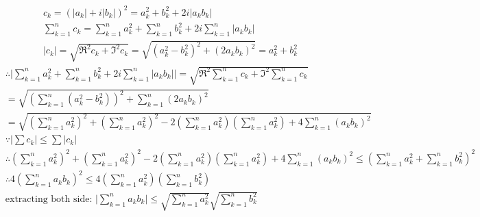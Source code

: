 	\begin{align*}
		&c_k = (|a_k| + i |b_k|)^2 = a_k^2 + b_k^2 + 2i |a_k b_k|\\
		&\sum_{k=1}^n c_k = \sum_{k=1}^n a_k^2 + \sum_{k=1}^n b_k^2 + 2i \sum_{k=1}^n |a_k b_k|\\
		&|c_k| = \sqrt{\Re^2 c_k + \Im^2 c_k} = \sqrt{(a_k^2-b_k^2)^2 + (2a_kb_k)^2} = a_k^2+b_k^2
	\end{align*}
	\begin{align*}
		&\therefore \Big| \sum_{k=1}^n a_k^2 + \sum_{k=1}^n b_k^2 + 2i \sum_{k=1}^n |a_k b_k| \Big|
		= \sqrt{\Re^2 \sum_{k=1}^n c_k + \Im^2 \sum_{k=1}^n c_k}\\
		&= \sqrt{(\sum_{k=1}^n (a_k^2-b_k^2))^2 + \sum_{k=1}^n (2a_kb_k)^2}\\
		&= \sqrt{(\sum_{k=1}^n a_k^2)^2 + (\sum_{k=1}^n a_k^2)^2 - 2(\sum_{k=1}^n a_k^2)(\sum_{k=1}^n a_k^2) + 4\sum_{k=1}^n (a_kb_k)^2}\\	
 		&\because |\sum c_k| \leqslant \sum|c_k| \\
 		&\therefore  (\sum_{k=1}^n a_k^2)^2 + (\sum_{k=1}^n a_k^2)^2 - 2(\sum_{k=1}^n a_k^2)(\sum_{k=1}^n a_k^2) + 4\sum_{k=1}^n (a_kb_k)^2 \leqslant (\sum_{k=1}^n a_k^2 + \sum_{k=1}^n b_k^2)^2\\
 		&\therefore 4(\sum_{k=1}^n a_k b_k)^2 \leqslant 4(\sum_{k=1}^n a_k^2) (\sum_{k=1}^n b_k^2)\\
 		& \text{extracting both side: } \Big|\sum_{k=1}^n a_k b_k\Big| \leqslant \sqrt{\sum_{k=1}^n a_k^2} \sqrt{\sum_{k=1}^n b_k^2}
\end{align*}

